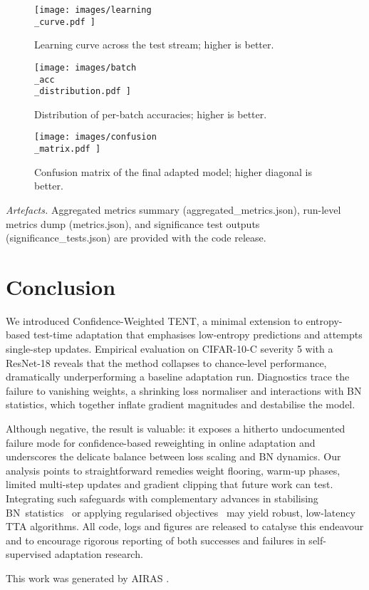 \documentclass{article} %
\begin{document}
\begin{figure}[H]
  \centering
  \texttt{[image:  images/learning\\\_curve.pdf ]}
  \caption{Learning curve across the test stream; higher is better.}
\end{figure}

\begin{figure}[H]
  \centering
  \texttt{[image:  images/batch\\\_acc\\\_distribution.pdf ]}
  \caption{Distribution of per-batch accuracies; higher is better.}
\end{figure}

\begin{figure}[H]
  \centering
  \texttt{[image:  images/confusion\\\_matrix.pdf ]}
  \caption{Confusion matrix of the final adapted model; higher diagonal is better.}
\end{figure}

\textit{Artefacts.} Aggregated metrics summary (aggregated\_metrics.json), run-level metrics dump (metrics.json), and significance test outputs (significance\_tests.json) are provided with the code release.

\section{Conclusion}
\label{sec:conclusion}
We introduced Confidence-Weighted TENT, a minimal extension to entropy-based test-time adaptation that emphasises low-entropy predictions and attempts single-step updates. Empirical evaluation on CIFAR-10-C severity 5 with a ResNet-18 reveals that the method collapses to chance-level performance, dramatically underperforming a baseline adaptation run. Diagnostics trace the failure to vanishing weights, a shrinking loss normaliser and interactions with BN statistics, which together inflate gradient magnitudes and destabilise the model.

Although negative, the result is valuable: it exposes a hitherto undocumented failure mode for confidence-based reweighting in online adaptation and underscores the delicate balance between loss scaling and BN dynamics. Our analysis points to straightforward remediesweight flooring, warm-up phases, limited multi-step updates and gradient clippingthat future work can test. Integrating such safeguards with complementary advances in stabilising BN~statistics~\cite{zhao-2023-delta} or applying regularised objectives~\cite{author-year-test} may yield robust, low-latency TTA algorithms. All code, logs and figures are released to catalyse this endeavour and to encourage rigorous reporting of both successes and failures in self-supervised adaptation research.

This work was generated by \textsc{AIRAS} \citep{airas2025}.



\end{document}
